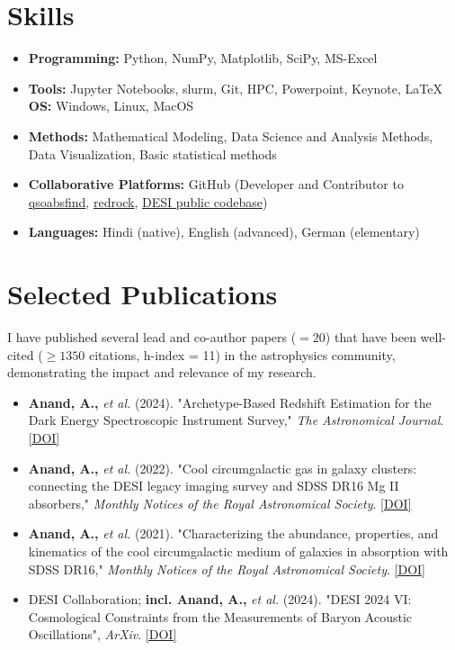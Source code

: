 \documentclass[a4paper,10pt]{article}
\begin{document}
\section*{Skills}
\begin{itemize}[noitemsep, topsep=0pt]
    \item \textbf{Programming:} Python, NumPy, Matplotlib, SciPy, MS-Excel
    \item \textbf{Tools:} Jupyter Notebooks, slurm, Git, HPC, Powerpoint, Keynote, LaTeX
    \tem \textbf{OS:} Windows, Linux, MacOS
    \item \textbf{Methods:} Mathematical Modeling, Data Science and Analysis Methods, Data Visualization, Basic statistical methods
    \item \textbf{Collaborative Platforms:} GitHub (Developer and Contributor to \href{https://github.com/abhi0395/qsoabsfind}{qsoabsfind}, \href{https://github.com/desihub/redrock}{redrock}, \href{https://github.com/desihub}{DESI public codebase})
     \item \textbf{Languages:} Hindi (native), English (advanced), German (elementary)
\end{itemize}

\section*{Selected Publications}
I have published several lead and co-author papers ($= 20$) that have been well-cited ($\geq 1350$ citations, h-index = 11) in the astrophysics community, demonstrating the impact and relevance of my research.
\begin{itemize}[noitemsep, topsep=0pt]
    \item \textbf{Anand, A.,} \textit{et al.} (2024). "Archetype-Based Redshift Estimation for the Dark Energy Spectroscopic Instrument Survey," \textit{The Astronomical Journal}. \href{https://iopscience.iop.org/article/10.3847/1538-3881/ad60c2}{[DOI]}
    \item \textbf{Anand, A.,} \textit{et al.} (2022). "Cool circumgalactic gas in galaxy clusters: connecting the DESI legacy imaging survey and SDSS DR16 Mg II absorbers," \textit{Monthly Notices of the Royal Astronomical Society}. \href{https://doi.org/10.1093/mnras/stab871}{[DOI]}
    \item \textbf{Anand, A.,} \textit{et al.} (2021). "Characterizing the abundance, properties, and kinematics of the cool circumgalactic medium of galaxies in absorption with SDSS DR16," \textit{Monthly Notices of the Royal Astronomical Society}. \href{https://doi.org/10.1093/mnras/stac928}{[DOI]}
    \item DESI Collaboration; \textbf{incl. Anand, A.,} \textit{et al.} (2024). "DESI 2024 VI: Cosmological Constraints from the Measurements of Baryon Acoustic Oscillations", \textit{ArXiv}. \href{10.48550/arXiv.2404.03002}{[DOI]}
\end{itemize}
\end{document}
